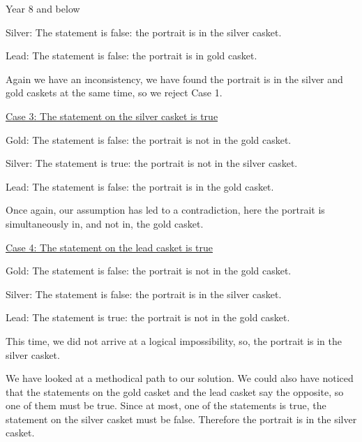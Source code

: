 \begin{MyInnerBox}{Year 8 and below}
{\begin{MySolutionBox}
        \hspace{1em}Silver: The statement is false: the portrait is in the silver casket.\par
        \hspace{1em}Lead: \;The statement is false: the portrait is in gold casket.\par
        Again we have an inconsistency, we have found the portrait is in the silver and gold caskets at the same time, so we reject Case 1.\par\medskip
        \underline{Case 3: The statement on the silver casket is true}\par
        \hspace{1em}Gold: \;The statement is false: the portrait is not in the gold casket.\par
        \hspace{1em}Silver: The statement is true: the portrait is not in the silver casket.\par
        \hspace{1em}Lead: \;The statement is false: the portrait is in the gold casket.\par
        Once again, our assumption has led to a contradiction, here the portrait is simultaneously in, and not in, the gold casket.\par\medskip
        \underline{Case 4: The statement on the lead casket is true}\par
        \hspace{1em}Gold: \;The statement is false: the portrait is not in the gold casket.\par
        \hspace{1em}Silver: The statement is false: the portrait is in the silver casket.\par
        \hspace{1em}Lead: \;The statement is true: the portrait is not in the gold casket.\par
        This time, we did not arrive at a logical impossibility, so, the portrait is in the silver casket.\par\medskip
        We have looked at a methodical path to our solution. We could also have noticed that the statements on the gold casket and the lead casket say the opposite, so one of them must be true. Since at most, one of the statements is true, the statement on the silver casket must be false. Therefore the portrait is in the silver casket.\par
      \end{MySolutionBox}
    }{}%
    \end{MyInnerBox}

